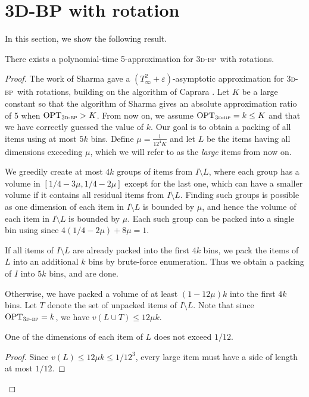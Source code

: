 \documentclass[a4paper,UKenglish,cleveref, autoref, thm-restate]{lipics-v2021}
\newcommand{\eps}{\varepsilon}
\newcommand{\opt}{\mathrm{OPT}}
\newcommand{\tbp}{\textsc{3d-bp}\xspace}
\begin{document}
\section{3D-BP with rotation}
\label{sec:rotation}



In this section, we show the following result.

\begin{theorem}
    There exists a polynomial-time 5-approximation for \tbp~with rotations.
\end{theorem}
\begin{proof}
    The work of Sharma \cite{Sharma21} gave a $(T_{\infty}^2+\eps)$-asymptotic approximation for \tbp~with rotations, building on the algorithm of Caprara \cite{caprara2008packing}. Let $K$ be a large constant so that the algorithm of Sharma gives an absolute approximation ratio of 5 when $\opt_{\tbp} > K$. From now on, we assume $\opt_{\tbp} = k \le K$ and that we have correctly guessed the value of $k$. Our goal is to obtain a packing of all items using at most $5k$ bins. Define $\mu = \frac{1}{12^4K}$ and let $L$ be the items having all dimensions exceeding $\mu$, which we will refer to as the \emph{large} items from now on.

    We greedily create at most $4k$ groups of items from $I\setminus L$, where each group has a volume in $[1/4-3\mu, 1/4-2\mu]$ except for the last one, which can have a smaller volume if it contains all residual items from $I\setminus L$.
    Finding such groups is possible as one dimension of each item in $I\setminus L$ is bounded by $\mu$, and hence the volume of each item in $I\setminus L$ is bounded by $\mu$.
    Each such group can be packed into a single bin using  since $4(1/4-2\mu)+8\mu = 1$. 
    
    If all items of $I\setminus L$ are already packed into the first $4k$ bins, we pack the items of $L$ into an additional $k$ bins by brute-force enumeration. Thus we obtain a packing of $I$ into $5k$ bins, and are done. 
    
    Otherwise, we have packed a volume of at least $(1-12\mu)k$ into the first $4k$ bins. 
    Let $T$ denote the set of unpacked items of $I\setminus L$. Note that since $\opt_{\tbp} = k$, we have $v(L\cup T) \le 12\mu k$.

    \begin{claim}
        One of the dimensions of each item of $L$ does not exceed $1/12$.
    \end{claim}
    \begin{proof}
        Since $v(L) \le 12\mu k \le 1/12^3$, every large item must have a side of length at most $1/12$.
    \end{proof}


\end{proof}
\end{document}
